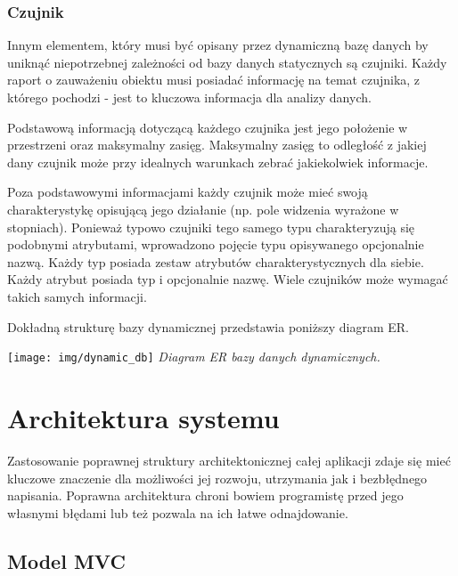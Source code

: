 {\subsubsection{Czujnik}
\par{
Innym elementem, który musi być opisany przez dynamiczną bazę danych by uniknąć niepotrzebnej zależności od bazy danych statycznych są czujniki. Każdy raport o zauważeniu obiektu musi posiadać informację na temat czujnika, z którego pochodzi - jest to kluczowa informacja dla analizy danych.
}
\par{
Podstawową informacją dotyczącą każdego czujnika jest jego położenie w przestrzeni oraz maksymalny zasięg. Maksymalny zasięg to odległość z jakiej dany czujnik może przy idealnych warunkach zebrać jakiekolwiek informacje.
}
\par{
Poza podstawowymi informacjami każdy czujnik może mieć swoją charakterystykę opisującą jego działanie (np. pole widzenia wyrażone w stopniach). Ponieważ typowo czujniki tego samego typu charakteryzują się podobnymi atrybutami, wprowadzono pojęcie typu opisywanego opcjonalnie nazwą. Każdy typ posiada zestaw atrybutów charakterystycznych dla siebie. Każdy atrybut posiada typ i opcjonalnie nazwę. Wiele czujników może wymagać takich samych informacji.
}
\par{
Dokładną strukturę bazy dynamicznej przedstawia poniższy diagram ER.
}


\par{
\begin{center}
\texttt{[image: img/dynamic\_db]}
\textit{Diagram ER bazy danych dynamicznych.}
\end{center}
}


\section[Architektura systemu][Architektura systemu]{Architektura systemu}
\par{
Zastosowanie poprawnej struktury architektonicznej całej aplikacji zdaje się mieć kluczowe znaczenie dla możliwości jej rozwoju, utrzymania jak i bezbłędnego napisania. Poprawna architektura chroni bowiem programistę przed jego własnymi błędami lub też pozwala na ich łatwe odnajdowanie.
}
\subsection{Model MVC}
}
